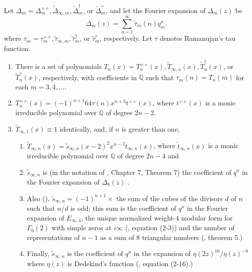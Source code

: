\documentclass{article}
\begin{document}
\begin{conjecture}
Let $\Delta_m = 
\Delta^{\diamond \diamond}_m,
\widetilde{\Delta}_{\infty,m},
\widetilde{\Delta}^{\dagger}_m$, or
$\widetilde{\Delta}^{\diamond}_m$,
and let 
the Fourier
expansion of $\Delta_m(z)$ be
$$
\Delta_m(z) = 
\sum_{n=1}^{\infty} \tilde{\tau}_m(n) q_m^n.
$$
where $\tau_m = \tau_m^{\diamond \diamond},
\tilde{\tau}_{\infty,m}, \tilde{\tau}_m^{\dagger}$,
or $\tilde{\tau}_m^{\diamond}$, respectively.
Let $\tau$ denotes Ramanujan's tau function.
\begin{enumerate}
\item There is a set of polynomials
$T_n(x) = T^{\diamond \diamond}_n(x), \widetilde{T}_{\infty,n}(x), 
\widetilde{T}^{\dagger}_n(x)$,
or $\widetilde{T}^{\diamond}_n(x)$, respectively, 
with coefficients in $\mathbb{Q}$ such that 
$\tau_m(n) = T_n(m)$ for each $m = 3, 4, ....$
\item $T^{\diamond \diamond}_n(x) = 
(-1)^{n+1}64 \tau(n) x^{n+3} t^{\diamond \diamond}(x)$,
where  $t^{\diamond \diamond}(x)$ is a monic irreducible polynomial
over $\mathbb{Q}$ of degree $2n - 2$.
\item
$\widetilde{T}_{\infty,1}(x) \equiv 1$ identically,
and, if $n$ is greater than one,  
\begin{enumerate}
\item $\widetilde{T}_{\infty,n}(x) = 
\tilde{s}_{\infty,n}
(x-2)^2 x^{n-1} \tilde{t}_{\infty,n}(x)$,
where $\tilde{t}_{\infty,n}(x)$ is a
monic irreducible polynomial 
over $\mathbb{Q}$
of degree $2n - 4$ and
\item
$\tilde{s}_{\infty,n}$ is 
(in the notation of \cite{conway2013sphere},
 Chapter 7, Theorem 7) the
coefficient of $q^n$ in the Fourier
expansion of $\Delta_8(z)$ \cite{OEIS3}. 
\item Also (\cite{OEIS4}), 
$\tilde{s}_{\infty,n} = 
(-1)^{n+1} \times$ the sum of the cubes 
of the divisors $d$  of $n$ such that 
$n/d$ is odd;
this sum is the coefficient of 
$q^n$ in the Fourier expansion
of $E_{\infty, 4}$,
the unique normalized weight-$4$ modular form 
for $\Gamma_0(2)$ with simple zeros at 
$i \infty$ (\cite{brent1998quadratic},
equation (2-3))
and the number of representations of 
$n-1$ as a sum of $8$ triangular numbers
(\cite{ono1995representation}, theorem 5.)
\item
Finally, $\tilde{s}_{\infty,n}$ is 
the coefficient of $q^n$ in the expansion 
of $\eta(2z)^{16}/\eta(z)^{-8}$
where $\eta(z)$ is Dedekind's function
(\cite{brent1998quadratic}, equation (2-16).)
\end{enumerate}

\end{enumerate}
\end{conjecture}
\end{document}
